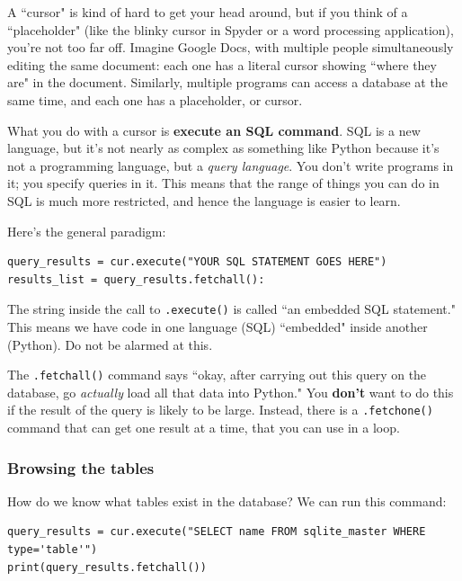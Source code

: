 \documentclass[12pt]{article}
\begin{document}
A ``cursor" is kind of hard to get your head around, but if you think of a
``placeholder" (like the blinky cursor in Spyder or a word processing
application), you're not too far off. Imagine Google Docs, with multiple
people simultaneously editing the same document: each one has a literal cursor
showing ``where they are" in the document. Similarly, multiple programs can
access a database at the same time, and each one has a placeholder, or cursor.

What you do with a cursor is \textbf{execute an SQL command}. SQL is a new
language, but it's not nearly as complex as something like Python because it's
not a programming language, but a \textit{query language}. You don't write
programs in it; you specify queries in it. This means that the range of things
you can do in SQL is much more restricted, and hence the language is easier to
learn.

Here's the general paradigm:
\begin{Verbatim}[fontsize=small,samepage=true,frame=none]
query_results = cur.execute("YOUR SQL STATEMENT GOES HERE")
results_list = query_results.fetchall():
\end{Verbatim}

The string inside the call to \texttt{.execute()} is called ``an embedded SQL
statement." This means we have code in one language (SQL) ``embedded" inside
another (Python). Do not be alarmed at this.

The \texttt{.fetchall()} command says ``okay, after carrying out this query on
the database, go \textit{actually} load all that data into Python." You
\textbf{don't} want to do this if the result of the query is likely to be
large. Instead, there is a \texttt{.fetchone()} command that can get one
result at a time, that you can use in a loop.

\subsubsection{Browsing the tables}

How do we know what tables exist in the database? We can run this command:

\begin{Verbatim}[fontsize=small,samepage=true,frame=none]
query_results = cur.execute("SELECT name FROM sqlite_master WHERE type='table'")
print(query_results.fetchall())
\end{Verbatim}
\end{document}
